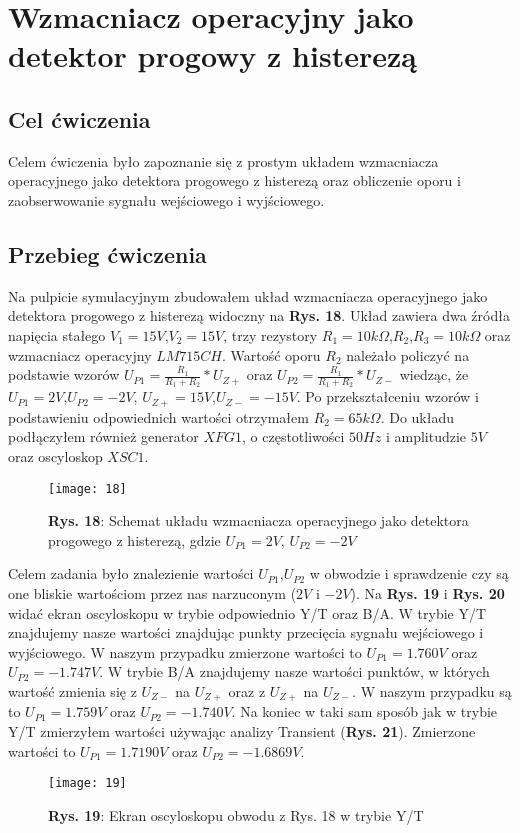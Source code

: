 \documentclass[11pt]{article}
\begin{document}
\section{Wzmacniacz operacyjny jako detektor progowy z histerezą}
\subsection{Cel ćwiczenia}
Celem ćwiczenia było zapoznanie się z prostym układem wzmacniacza operacyjnego jako detektora progowego z histerezą oraz obliczenie oporu i zaobserwowanie sygnału wejściowego i wyjściowego.
\subsection{Przebieg ćwiczenia}
Na pulpicie symulacyjnym zbudowałem układ wzmacniacza operacyjnego jako detektora progowego z histerezą widoczny na \textbf{Rys. 18}. Układ zawiera dwa źródła napięcia stałego $V_1=15V$,$V_2=15V$, trzy rezystory $R_1=10k\Omega$,$R_2$,$R_3=10k\Omega$ oraz wzmacniacz operacyjny $LM715CH$. Wartość 
oporu $R_2$ należało policzyć na podstawie wzorów $U_{P1}=\frac{R_1}{R_1+R_2}*U_{Z+}$ oraz $U_{P2}=\frac{R_1}{R_1+R_2}*U_{Z-}$ wiedząc, że $U_{P1}=2V$,$U_{P2}=-2V$, $U_{Z+}=15V$,$U_{Z-}=-15V$. Po przekształceniu wzorów i podstawieniu odpowiednich wartości otrzymałem $R_2=65k\Omega$.
Do układu podłączyłem również generator $XFG1$, o częstotliwości $50Hz$ i amplitudzie $5V$ oraz oscyloskop $XSC1$.
\begin{figure}[H]
\centering
\texttt{[image: 18]}
\caption*{\textbf{Rys. 18}: Schemat układu wzmacniacza operacyjnego jako detektora progowego z histerezą, gdzie $U_{P1}=2V$, $U_{P2}=-2V$}
\end{figure}
\noindent Celem zadania było znalezienie wartości $U_{P1}$,$U_{P2}$ w obwodzie i sprawdzenie czy są one bliskie wartościom przez nas narzuconym ($2V$ i $-2V$). Na \textbf{Rys. 19} i \textbf{Rys. 20} widać ekran oscyloskopu w trybie odpowiednio Y/T oraz B/A. W trybie Y/T znajdujemy nasze wartości znajdując punkty przecięcia 
sygnału wejściowego i wyjściowego. W naszym przypadku zmierzone wartości to $U_{P1}=1.760V$ oraz $U_{P2}=-1.747V$. W trybie B/A znajdujemy nasze wartości punktów, w których wartość zmienia się z $U_{Z-}$ na $U_{Z+}$ oraz z $U_{Z+}$ na $U_{Z-}$. W naszym przypadku są to $U_{P1}=1.759V$ oraz 
$U_{P2}=-1.740V$. Na koniec w taki sam sposób jak w trybie Y/T zmierzyłem wartości używając analizy Transient (\textbf{Rys. 21}). Zmierzone wartości to $U_{P1}=1.7190V$ oraz $U_{P2}=-1.6869V$. 
\begin{figure}[H]
\centering
\texttt{[image: 19]}
\caption*{\textbf{Rys. 19}: Ekran oscyloskopu obwodu z Rys. 18 w trybie Y/T}
\end{figure}
\end{document}
